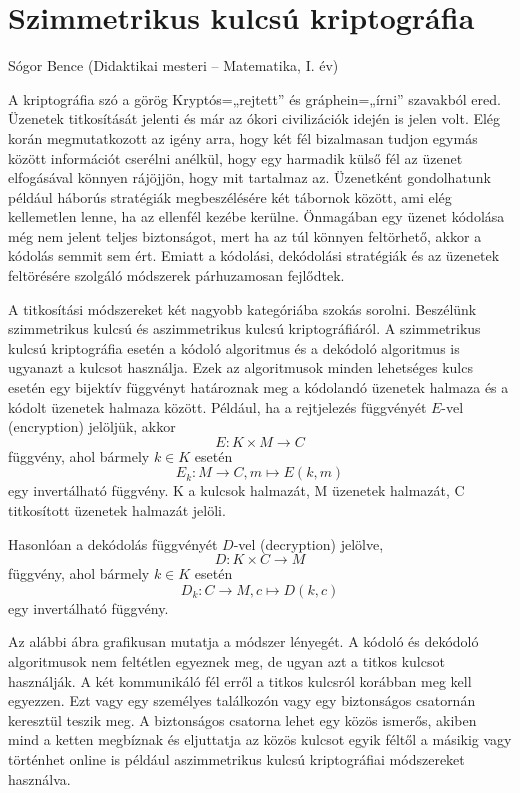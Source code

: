 
\chapter{Szimmetrikus kulcsú kriptográfia}\label{chap:szimmetrikus-kripto}
\begin{description}
{\large \item [{Szerző:}] Sógor Bence (Didaktikai mesteri -- Matematika, I. év)}
\end{description}
A kriptográfia szó a görög Kryptós=„rejtett” és gráphein=„írni” szavakból
ered. Üzenetek titkosítását jelenti és már az ókori civilizációk idején
is jelen volt. Elég korán megmutatkozott az igény arra, hogy két fél
bizalmasan tudjon egymás között információt cserélni anélkül, hogy
egy harmadik külső fél az üzenet elfogásával könnyen rájöjjön, hogy
mit tartalmaz az. Üzenetként gondolhatunk például háborús stratégiák
megbeszélésére két tábornok között, ami elég kellemetlen lenne, ha
az ellenfél kezébe kerülne. Önmagában egy üzenet kódolása még nem
jelent teljes biztonságot, mert ha az túl könnyen feltörhető, akkor
a kódolás semmit sem ért. Emiatt a kódolási, dekódolási stratégiák
és az üzenetek feltörésére szolgáló módszerek párhuzamosan fejlődtek.

A titkosítási módszereket két nagyobb kategóriába szokás sorolni.
Beszélünk szimmetrikus kulcsú és aszimmetrikus kulcsú kriptográfiáról.
A szimmetrikus kulcsú kriptográfia esetén a kódoló algoritmus és a
dekódoló algoritmus is ugyanazt a kulcsot használja. Ezek az algoritmusok
minden lehetséges kulcs esetén egy bijektív függvényt határoznak meg
a kódolandó üzenetek halmaza és a kódolt üzenetek halmaza között.
Például, ha a rejtjelezés függvényét $E$-vel (encryption) jelöljük,
akkor 
\[
E:K\times M\rightarrow C
\]
függvény, ahol bármely $k\in K$ esetén 
\[
E_{k}:M\rightarrow C,m\mapsto E(k,m)
\]
egy invertálható függvény. K a kulcsok halmazát, M üzenetek halmazát,
C titkosított üzenetek halmazát jelöli.

Hasonlóan a dekódolás függvényét $D$-vel (decryption) jelölve, 
\[
D:K\times C\rightarrow M
\]
függvény, ahol bármely $k\in K$ esetén 
\[
D_{k}:C\rightarrow M,c\mapsto D(k,c)
\]
egy invertálható függvény.

Az alábbi ábra grafikusan mutatja a módszer lényegét. A kódoló és
dekódoló algoritmusok nem feltétlen egyeznek meg, de ugyan azt a titkos
kulcsot használják. A két kommunikáló fél erről a titkos kulcsról
korábban meg kell egyezzen. Ezt vagy egy személyes találkozón vagy
egy biztonságos csatornán keresztül teszik meg. A biztonságos csatorna
lehet egy közös ismerős, akiben mind a ketten megbíznak és eljuttatja
az közös kulcsot egyik féltől a másikig vagy történhet online is például
aszimmetrikus kulcsú kriptográfiai módszereket használva.

